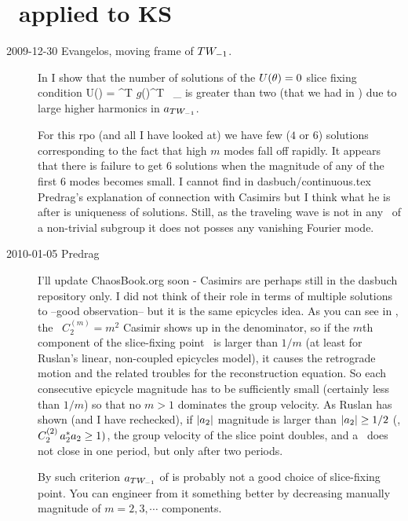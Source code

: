 \section{\Mslices\ applied to KS}
\renewcommand{\LieElrep}{\ensuremath{g}} %

\begin{description}

\item[2009-12-30 Evangelos, moving frame of $TW_{-1}$.]
In  I show that the number of
solutions of the $U(\theta) = 0$ slice fixing condition \beq
U(\gSpace) = \ssp^T \LieElrep(\gSpace)^T \Lg \,
\ssp_{}  is greater than two (that
we had in \cLe) due to large higher harmonics in
$a_{TW_{-1}}$.

For this rpo (and all I have looked at) we have few ($4$ or
$6$) solutions corresponding to the fact that high $m$ modes
fall off rapidly. It appears that there is failure to get $6$
solutions when the magnitude of any of the first $6$ modes
becomes small. I cannot find in dasbuch/continuous.tex
Predrag's explanation of connection with Casimirs but I think
what he is after is uniqueness of solutions. Still, as the
traveling wave is not in any \fixedsp\ of a non-trivial
subgroup it does not posses any vanishing Fourier mode.

\item[2010-01-05 Predrag] I'll update ChaosBook.org soon -
Casimirs are perhaps still in the dasbuch repository only. I
did not think of their role in terms of multiple solutions to
 --good observation-- but it is the same
epicycles idea. As you can see in , the
\ $C_2^{(m)} = m^2$ Casimir shows up in the
denominator, so if the $m$th component of the slice-fixing
point \slicep\ is larger than $1/m$ (at least for Ruslan's
linear, non-coupled epicycles model), it causes the
retrograde motion and the related troubles for the
reconstruction equation. So each consecutive epicycle
magnitude has to be sufficiently small (certainly less than
$1/m$) so that no $m>1$ dominates the group velocity. As
Ruslan has shown (and I have rechecked), if $|a_2|$
magnitude is larger than $|a_2| \geq 1/2$ (\ie, $C_2^{(2)}\,
a_2^* a_2 \geq 1)$, the group velocity of the slice
point doubles, and a \rpo\ does not close in one period, but
only after two periods.

By such criterion $a_{TW_{-1}}$ of
 is probably not a good choice of
slice-fixing point. You can engineer from it something better by
decreasing manually magnitude of $m=2,3,\cdots$ components.


\end{description}
